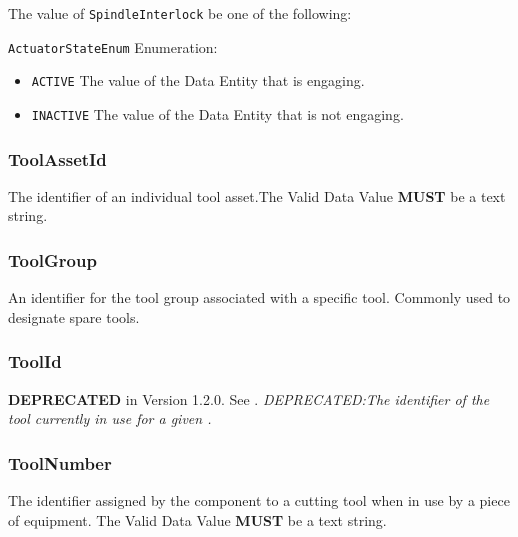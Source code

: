 The value of \texttt{SpindleInterlock} \MUST be one of the following: 


\texttt{ActuatorStateEnum} Enumeration:

\begin{itemize}
\item \texttt{ACTIVE} \newline The value of the \gls{Data Entity} that is engaging. 
\item \texttt{INACTIVE} \newline The value of the \gls{Data Entity} that is not engaging. 
\end{itemize}

\FloatBarrier

\subsubsection{ToolAssetId}
\label{sec:ToolAssetId}



The identifier of an individual tool asset.The \gls{Valid Data Value} \textbf{MUST} be a text string.


\subsubsection{ToolGroup}
\label{sec:ToolGroup}



An identifier for the tool group associated with a specific tool. Commonly used to designate spare tools.


\subsubsection{ToolId}
\label{sec:ToolId}



\textbf{DEPRECATED} in Version 1.2.0.   See . \textit{DEPRECATED:The identifier of the tool currently in use for a given .}


\subsubsection{ToolNumber}
\label{sec:ToolNumber}



The identifier assigned by the  component to a cutting tool when in use by a piece of equipment. 
 The \gls{Valid Data Value} \textbf{MUST} be a text string.


